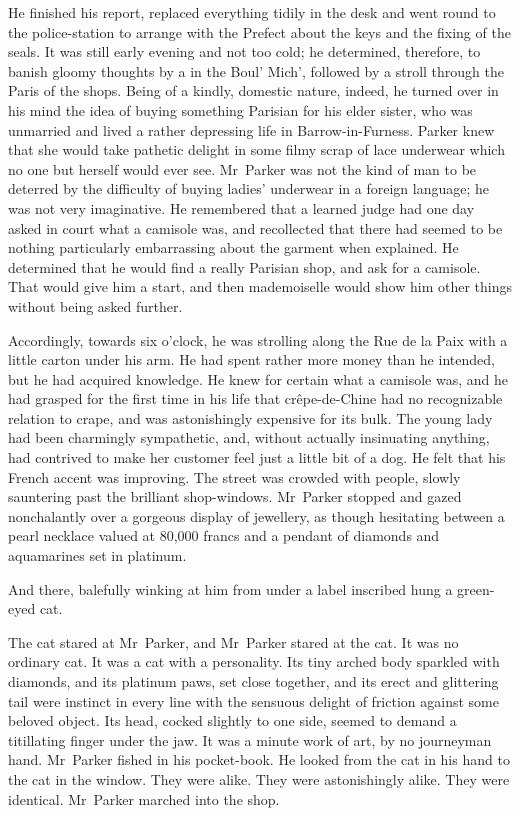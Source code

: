 He finished his report, replaced everything tidily in the desk and went round to the police-station to arrange with the Prefect about the keys and the fixing of the seals. It was still early evening and not too cold; he determined, therefore, to banish gloomy thoughts by a  in the Boul' Mich', followed by a stroll through the Paris of the shops. Being of a kindly, domestic nature, indeed, he turned over in his mind the idea of buying something Parisian for his elder sister, who was unmarried and lived a rather depressing life in Barrow-in-Furness. Parker knew that she would take pathetic delight in some filmy scrap of lace underwear which no one but herself would ever see. Mr~Parker was not the kind of man to be deterred by the difficulty of buying ladies' underwear in a foreign language; he was not very imaginative. He remembered that a learned judge had one day asked in court what a camisole was, and recollected that there had seemed to be nothing particularly embarrassing about the garment when explained. He determined that he would find a really Parisian shop, and ask for a camisole. That would give him a start, and then mademoiselle would show him other things without being asked further.

Accordingly, towards six o'clock, he was strolling along the Rue de la Paix with a little carton under his arm. He had spent rather more money than he intended, but he had acquired knowledge. He knew for certain what a camisole was, and he had grasped for the first time in his life that crêpe-de-Chine had no recognizable relation to crape, and was astonishingly expensive for its bulk. The young lady had been charmingly sympathetic, and, without actually insinuating anything, had contrived to make her customer feel just a little bit of a dog. He felt that his French accent was improving. The street was crowded with people, slowly sauntering past the brilliant shop-windows. Mr~Parker stopped and gazed nonchalantly over a gorgeous display of jewellery, as though hesitating between a pearl necklace valued at 80,000 francs and a pendant of diamonds and aquamarines set in platinum.

And there, balefully winking at him from under a label inscribed  hung a green-eyed cat.

The cat stared at Mr~Parker, and Mr~Parker stared at the cat. It was no ordinary cat. It was a cat with a personality. Its tiny arched body sparkled with diamonds, and its platinum paws, set close together, and its erect and glittering tail were instinct in every line with the sensuous delight of friction against some beloved object. Its head, cocked slightly to one side, seemed to demand a titillating finger under the jaw. It was a minute work of art, by no journeyman hand. Mr~Parker fished in his pocket-book. He looked from the cat in his hand to the cat in the window. They were alike. They were astonishingly alike.  They were identical. Mr~Parker marched into the shop.

